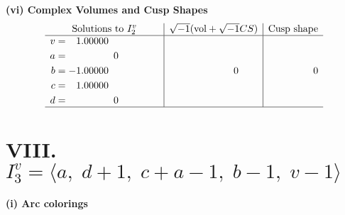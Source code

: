 \documentclass[1p]{elsarticle_modified}
\theoremstyle{definition}
\newcommand{\I}{\sqrt{-1}}
\begin{document}
\newpage\flushleft \textbf{(vi) Complex Volumes and Cusp Shapes}
$$\begin{array}{c|c|c}  
\text{Solutions to }I^v_{2}& \I (\text{vol} + \sqrt{-1}CS) & \text{Cusp shape}\\
 \hline 
\begin{aligned}
v &= \phantom{-}1.00000\phantom{ +0.000000I} \\
a &= \phantom{-0.000000 } 0 \\
b &= -1.00000\phantom{ +0.000000I} \\
c &= \phantom{-}1.00000\phantom{ +0.000000I} \\
d &= \phantom{-0.000000 } 0\end{aligned}
 & \phantom{-0.000000 } 0 & \phantom{-0.000000 } 0\\
 \hline 
 \end{array}$$\newpage\newpage\renewcommand{\arraystretch}{1}
\centering \section*{VIII. $I^v_{3}= \langle a,\;d+1,\;c+a-1,\;b-1,\;v-1 \rangle$}
\flushleft \textbf{(i) Arc colorings}\\
\end{document}

